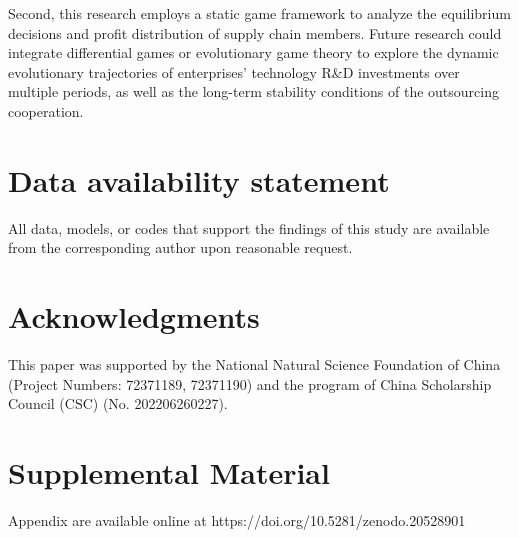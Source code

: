 \documentclass[authoryear,preprint,review,times,10pt]{elsarticle}
\begin{document}
Second, this research employs a static game framework to analyze the equilibrium decisions and profit distribution of supply chain members. Future research could integrate differential games or evolutionary game theory to explore the dynamic evolutionary trajectories of enterprises' technology R\&D investments over multiple periods, as well as the long-term stability conditions of the outsourcing cooperation.

\section*{Data availability statement}
All data, models, or codes that support the findings of this study are available from the corresponding author upon reasonable request.

\section*{Acknowledgments}
This paper was supported by the National Natural Science Foundation of China (Project Numbers: 72371189, 72371190) and the program of China Scholarship Council (CSC) (No. 202206260227).

\section*{Supplemental Material}
Appendix are available online at https://doi.org/10.5281/zenodo.20528901



\end{document}
